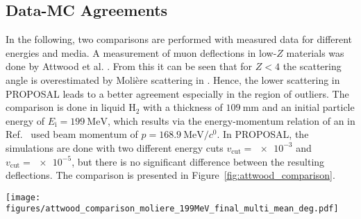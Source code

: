 \subsection{Data-MC Agreements}
In the following, two comparisons are performed with measured data for 
different energies and media.
A measurement of muon deflections in low-$Z$ materials was done by Attwood et al. \cite{attwood_2006}. 
From this it can be seen that for $Z < 4$ the scattering angle is overestimated 
by Molière scattering in . Hence, the lower scattering in PROPOSAL leads 
to a better agreement especially in the region of outliers. The comparison is 
done in liquid $\text{H}_2$ with a thickness of $\SI{109}{\milli\meter}$ and an 
initial particle energy of $E_{\mathrm{i}} = \SI{199}{\mega\electronvolt}$, which 
results via the energy-momentum relation of an in Ref.~\cite{attwood_2006} used beam momentum 
of $p = \SI[per-mode=symbol]{168.9}{\mega\electronvolt\per\clight}$. 
In PROPOSAL, the simulations are done with two different energy cuts $v_{\mathrm{cut}} = \num{e-3}$ and $v_{\mathrm{cut}} = \num{e-5}$, 
but there is no significant difference between the resulting deflections.
The comparison is presented in Figure~\ref{fig:attwood_comparison}.

\begin{figure*}
    \centering 
    \texttt{[image: figures/attwood\_comparison\_moliere\_199MeV\_final\_multi\_mean\_deg.pdf]}
    \caption{
    Muons are 
    propagated with $E_{\mathrm{i}} = \SI{199}{\mega\electronvolt}$ through 
    $\SI{109}{\milli\meter}$ of liquid $\text{H}_2$.
    Measured data of Attwood et al. and simulation data of  are taken from Ref.~\cite{attwood_2006}.    
    The figure presents 
    the normalized counts in dependence of the projected scattering angle $\theta_{\mathrm{y}}$ in degree.
    In PROPOSAL, $100$ simulations each with $\num{e5}$ muons are performed for two different settings using the energy cut 
    $v_{\mathrm{cut}} = \num{e-5}$. The blue points present the mean considering stochastic deflections and Molière scattering, the orange points
    present the mean taking into account only Molière scattering.   
    The uncertainties on the $x$--axis result due to the measured bin widths. The $y$--uncertainties are the standard deviations.   
    The deflections are  
    underestimated in PROPOSAL, except at $\theta_{\mathrm{y}} \approx \SI{0}{\degree}$. At deflections $\SI{2}{\degree} < \theta_{\mathrm{y}} < \SI{5}{\degree}$, 
    the result seems to be more accurate than 's. The consideration of the stochastic deflections shows no significant influence.}
    \label{fig:attwood_comparison}
\end{figure*}


